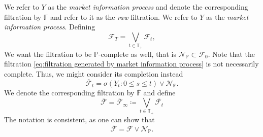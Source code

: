\documentclass[11pt,a4paper,twoside,openany]{report}
\theoremstyle{plain} %
\theoremstyle{definition} %
\theoremstyle{remark} %
\begin{document}
We refer to \(Y\) as the \textit{market information process} and denote the corresponding filtration by \(\mathbb{F}\) and refer to it as the \textit{raw} filtration.
We refer to \(Y\) as the \textit{market information process}. Defining 
\begin{equation}
    \mathcal{F}_T=\bigvee_{t\in\mathbb{T}_+}\mathcal{F}_t,
\end{equation}
We want the filtration to be \(\mathbb{P}\)-complete as well, that is \(\mathcal{N}_{\mathbb{P}}\subset\mathcal{F}_0\). Note that the filtration \cref{eq:filtration generated by market information process} is not necessarily complete.
Thus, we might consider its completion instead
\begin{equation}\label{eq:completed filtration}
    \overline{\mathcal{F}}_t=\sigma(Y_t:0\leq s\leq t)\vee \mathcal{N}_{\mathbb{P}}.
\end{equation}
We denote the corresponding filtration by \(\overline{\mathbb{F}}\) and define
\begin{equation}
    \overline{\mathcal{F}}=\overline{\mathcal{F}}_{\infty}\coloneqq \bigvee_{t\in\mathbb{T}_+}\overline{\mathcal{F}_t}
\end{equation}
The notation is consistent, as one can show that 
\begin{equation}
    \overline{\mathcal{F}}=\mathcal{F}\vee\mathcal{N}_{\mathbb{P}}. 
\end{equation}
\end{document}
